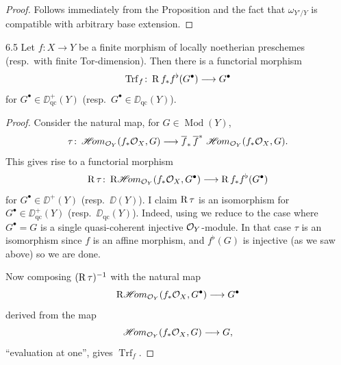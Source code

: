 \begin{proof}
Follows immediately from the Proposition and the fact that $\omega_{Y'/Y}$ is compatible with arbitrary base extension.
\end{proof}

\begin{bookproposition}{6.5}\label{prop:3.6.5}
Let $f\colon X\to Y$ be a finite morphism of locally noetherian preschemes (resp.\ with finite Tor-dimension). Then there is a functorial morphism
\[
\operatorname{Trf}_f \colon \operatorname{R} f_* f^{\flat}(G^\bullet) \longrightarrow G^\bullet
\]
for $G^\bullet\in\DD_{\mathrm{qc}}^+(Y)$ (resp.\ $G^\bullet\in\DD_{\mathrm{qc}}(Y)$).
\end{bookproposition}

\begin{proof}
Consider the natural map, for $G\in\operatorname{Mod}(Y)$,
\[
\tau\colon \mathop{\mathscr{H}\!om}\nolimits_{\mathcal{O}_Y}(f_*\mathcal{O}_X,G) \longrightarrow \overline{f}_*\,\overline{f}^*\,\mathop{\mathscr{H}\!om}\nolimits_{\mathcal{O}_Y}(f_*\mathcal{O}_X,G).
\]
This gives rise to a functorial morphism 
\[
\operatorname{R}\tau \colon \mathop{\mathrm{R}\mathscr{H}\!om}\nolimits_{\mathcal{O}_Y}(f_*\mathcal{O}_X, G^\bullet) \longrightarrow \operatorname{R} f_* f^{\flat}(G^\bullet)
\]
for $G^\bullet\in\DD^+(Y)$ (resp.\ $\DD(Y)$). I claim $\operatorname{R}\tau$ is an isomorphism for $G^\bullet\in\DD_{\mathrm{qc}}^+(Y)$ (resp.\ $\DD_{\mathrm{qc}}(Y)$). Indeed, using  we reduce to the case where $G^\bullet=G$ is a single quasi-coherent injective $\mathcal{O}_Y$-module. In that case $\tau$ is an isomorphism \cite[\nopp II,~1.4.3]{EGA} since $f$ is an affine morphism, and $f^{\flat}(G)$ is injective (as we saw above) so we are done.

Now composing $(\operatorname{R}\tau)^{-1}$ with the natural map
\[
\mathop{\mathrm{R}\mathscr{H}\!om}\nolimits_{\mathcal{O}_Y}(f_*\mathcal{O}_X,G^\bullet) \longrightarrow G^\bullet
\]
derived from the map
\[
\mathop{\mathscr{H}\!om}\nolimits_{\mathcal{O}_Y}(f_*\mathcal{O}_X,G) \longrightarrow G,
\]
``evaluation at one'', gives $\operatorname{Trf}_f$.
\end{proof}


